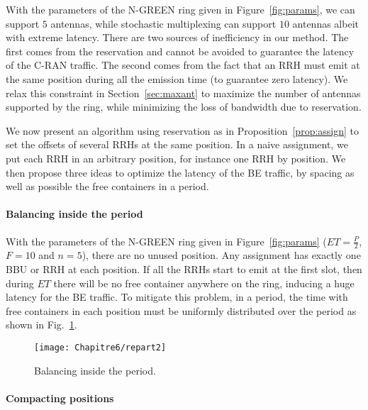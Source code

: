 With the parameters of the N-GREEN ring given in Figure~\ref{fig:params}, we can support $5$ antennas, while stochastic multiplexing can support $10$ antennas albeit with extreme latency. There are two sources of inefficiency in our method. The first comes from the reservation and cannot be avoided to guarantee the latency of the C-RAN traffic. The second comes from the fact that an RRH must emit at the same position during all the emission time (to guarantee zero latency). We relax this constraint in Section~\ref{sec:maxant} to maximize the number of antennas supported by the ring, while minimizing the loss of bandwidth due to reservation.

We now present an algorithm using reservation as in Proposition~\ref{prop:assign} to set the offsets of several RRHs at the same position. In a naive assignment, we put each RRH in an arbitrary position, for instance one RRH by position. We then propose three ideas to optimize the latency of the BE traffic, by spacing as well as possible the free containers in a period.

\paragraph{Balancing inside the period}

With the parameters of the N-GREEN ring given in Figure~\ref{fig:params} ($ET = \frac{P}{2}$, $F = 10$ and $n = 5$), there are no unused position. Any assignment has exactly one  BBU or RRH at each position. If all the RRHs start to emit at the first slot, then during $ET$ there will be no free container anywhere on the ring, inducing a huge latency for the BE traffic. 
To mitigate this problem, in a period, the time with free containers in each position must be uniformly distributed over the period as shown in Fig.~\ref{fig:periodbal}.

\begin{figure}[h!]
\begin{center}   

      \texttt{[image: Chapitre6/repart2]}
     \caption{Balancing inside the period.}\label{fig:periodbal}
     
\end{center}
  \end{figure}  
    
  
\paragraph{Compacting positions}

